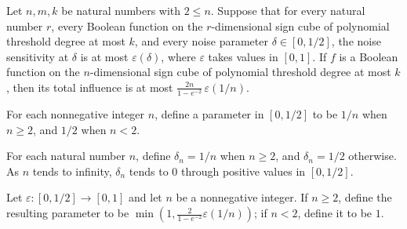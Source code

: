\begin{theorem}
\label{FABL.totalInfluence_le_two_div_one_sub_exp_neg_two_mul_dimension_mul_noiseModulus}
\leanok
{}
Let $n,m,k$ be natural numbers with $2\le n$. Suppose that for every natural number $r$,
every Boolean function on the $r$-dimensional sign cube of polynomial threshold degree
at most $k$, and every noise parameter $\delta\in[0,1/2]$, the noise sensitivity at
$\delta$ is at most $\varepsilon(\delta)$, where $\varepsilon$ takes values in $[0,1]$.
If $f$ is a Boolean function on the $n$-dimensional sign cube of polynomial threshold
degree at most $k$, then its total influence is at most
$\frac{2n}{1-e^{-2}}\,\varepsilon(1/n)$.
\end{theorem}

\begin{definition}
\label{FABL.inverseDimensionHalfNoiseParameter}
\leanok
{}
For each nonnegative integer $n$, define a parameter in $[0,1/2]$ to be $1/n$ when
$n\ge2$, and $1/2$ when $n<2$.
\end{definition}

\begin{theorem}
\label{FABL.tendsto_inverseDimensionHalfNoiseParameter}
\leanok
{}
For each natural number $n$, define $\delta_n=1/n$ when $n\ge2$, and $\delta_n=1/2$
otherwise. As $n$ tends to infinity, $\delta_n$ tends to $0$ through positive values in
$[0,1/2]$.
\end{theorem}

\begin{definition}
\label{FABL.influenceModulusOfNoiseModulus}
\leanok
{}
Let $\varepsilon:[0,1/2]\to[0,1]$ and let $n$ be a nonnegative integer. If $n\ge2$,
define the resulting parameter to be
$\min\!\left(1,\frac{2}{1-e^{-2}}\varepsilon(1/n)\right)$; if $n<2$, define it to be
$1$.
\end{definition}

